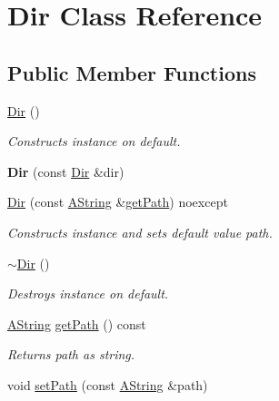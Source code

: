 \hypertarget{class_dir}{}\section{Dir Class Reference}
\label{class_dir}
\subsection*{Public Member Functions}
\begin{DoxyCompactItemize}
\item 
\mbox{\label{class_dir_a115c8eedb11ea03f79338a780920ae84}} 
\mbox{\hyperlink{class_dir_a115c8eedb11ea03f79338a780920ae84}{Dir}} ()
\begin{DoxyCompactList}\small\item\em Constructs instance on default. \end{DoxyCompactList}\item 
\mbox{\label{class_dir_a11b1a16ab3197a15c3807df0e09fce4e}} 
{\bfseries Dir} (const \mbox{\hyperlink{class_dir}{Dir}} \&dir)
\item 
\mbox{\hyperlink{class_dir_a1ed21a07355d3492c201d3a212aae637}{Dir}} (const \mbox{\hyperlink{class_a_string}{A\+String}} \&\mbox{\hyperlink{class_dir_a000627e9787773619bccc3d4ef76a7ac}{get\+Path}}) noexcept
\begin{DoxyCompactList}\small\item\em Constructs instance and sets default value path. \end{DoxyCompactList}\item 
\mbox{\label{class_dir_a427bcc717e5668e764fa1a4432c74b54}} 
\mbox{\hyperlink{class_dir_a427bcc717e5668e764fa1a4432c74b54}{$\sim$\+Dir}} ()
\begin{DoxyCompactList}\small\item\em Destroys instance on default. \end{DoxyCompactList}\item 
\mbox{\hyperlink{class_a_string}{A\+String}} \mbox{\hyperlink{class_dir_a000627e9787773619bccc3d4ef76a7ac}{get\+Path}} () const
\begin{DoxyCompactList}\small\item\em Returns path as string. \end{DoxyCompactList}\item 
void \mbox{\hyperlink{class_dir_a08bb155c0d0ae5150997dedce31aa56f}{set\+Path}} (const \mbox{\hyperlink{class_a_string}{A\+String}} \&path)

\end{DoxyCompactItemize}
